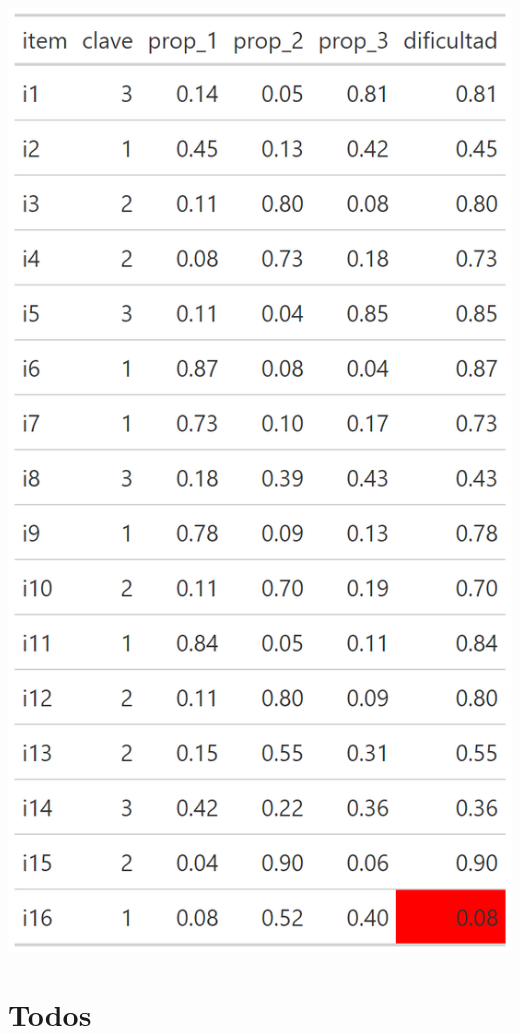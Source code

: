 \documentclass[
  letterpaper,
  DIV=11,
  numbers=noendperiod]{scrreprt}
\begin{document}
\begin{center}
\includegraphics[width=0.6\linewidth,height=\textheight,keepaspectratio]{images/teoria_clasica_diff_dificil.png}
\end{center}

\section{Todos}
\end{document}
